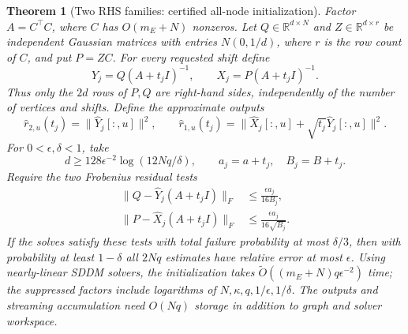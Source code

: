 \documentclass[11pt]{article}
\newtheorem{theorem}{Theorem}
\newcommand{\R}{\mathbb R}
\begin{document}
\begin{theorem}[Two RHS families: certified all-node initialization]\label{thm:initialization}
Factor $A=C^\top C$, where $C$ has $O(m_E+N)$ nonzeros.
Let $Q\in\R^{d\times N}$ and $Z\in\R^{d\times r}$ be independent
Gaussian matrices with entries $N(0,1/d)$, where $r$ is the row count
of $C$, and put $P=ZC$. For every requested shift define
\[
 Y_j=Q(A+t_jI)^{-1},\qquad X_j=P(A+t_jI)^{-1}.
\]
Thus only the $2d$ rows of $P,Q$ are right-hand sides, independently
of the number of vertices and shifts. Define the approximate outputs
\begin{equation}\label{eq:allnodediags}
 \widehat r_{2,u}(t_j)=\|\widehat Y_j[:,u]\|^2,\qquad
 \widehat r_{1,u}(t_j)
   =\|\widehat X_j[:,u]+\sqrt{t_j}\widehat Y_j[:,u]\|^2.
\end{equation}
For $0<\epsilon,\delta<1$, take
\[
 d\geq128\epsilon^{-2}\log(12Nq/\delta),\qquad
 a_j=a+t_j,\quad B_j=B+t_j.
\]
Require the two Frobenius residual tests
\begin{align}
 \|Q-\widehat Y_j(A+t_jI)\|_F
       &\leq\frac{\epsilon a_j}{16B_j},\label{eq:resY}\\
 \|P-\widehat X_j(A+t_jI)\|_F
       &\leq\frac{\epsilon a_j}{16\sqrt{B_j}}.\label{eq:resX}
\end{align}
If the solves satisfy these tests with total failure probability at
most $\delta/3$, then with probability at least $1-\delta$ all
$2Nq$ estimates have relative error at most $\epsilon$.
Using nearly-linear SDDM solvers, the initialization takes
$\widetilde O((m_E+N)q\epsilon^{-2})$ time; the suppressed factors
include logarithms of $N,\kappa,q,1/\epsilon,1/\delta$.
The outputs and streaming accumulation need $O(Nq)$ storage in
addition to graph and solver workspace.
\end{theorem}
\end{document}
